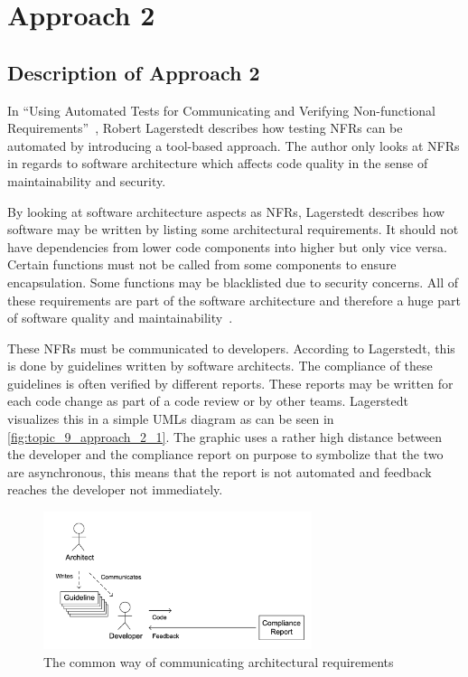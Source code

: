 
\section{Approach 2} \label{sec:9_approach_2}

\subsection{Description of Approach 2}

In \enquote{Using Automated Tests for Communicating and Verifying Non-functional Requirements}~\cite{Lagerstedt2014}, Robert Lagerstedt describes how testing \glspl{NFR} can be automated by introducing a tool-based approach.
The author only looks at \glspl{NFR} in regards to software architecture which affects code quality in the sense of maintainability and security.

By looking at software architecture aspects as \glspl{NFR}, Lagerstedt describes how software may be written by listing some architectural requirements.
It should not have dependencies from lower code components into higher but only vice versa.
Certain functions must not be called from some components to ensure encapsulation. Some functions may be blacklisted due to security concerns.
All of these requirements are part of the software architecture and therefore a huge part of software quality and maintainability~\cite{Lagerstedt2014}.

These \glspl{NFR} must be communicated to developers. According to Lagerstedt, this is done by guidelines written by software architects.
The compliance of these guidelines is often verified by different reports. These reports may be written for each code change as part of a code review or by other teams.
Lagerstedt visualizes this in a simple \glspl{UML} diagram as can be seen in
\autoref{fig:topic_9_approach_2_1}.
The graphic uses a rather high distance between the developer and the compliance report on purpose to symbolize that the two are asynchronous, this means that the report is not automated and feedback reaches the developer not immediately.

\begin{figure}[htbp]
	\centering
	\includegraphics[width=0.7\textwidth]{../images/topic_9_approach_2_1.png}
	\caption{The common way of communicating architectural requirements~\cite{Lagerstedt2014}}
	\label{fig:topic_9_approach_2_1}
\end{figure}


